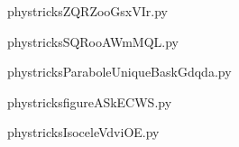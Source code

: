 
    \newcommand{\CaptionFigZQRZooGsxVIr}{<+Type your caption here+>}
    \begin{center}
        
    \end{center}
    phystricksZQRZooGsxVIr.py

    

    \clearpage
    


    \newcommand{\CaptionFigSQRooAWmMQL}{<+Type your caption here+>}
    \begin{center}
        
    \end{center}
    phystricksSQRooAWmMQL.py

    

    \clearpage
    


    \newcommand{\CaptionFigParaboleUniqueBaskGdqda}{<+Type your caption here+>}
    \begin{center}
        
    \end{center}
    phystricksParaboleUniqueBaskGdqda.py

    

    \clearpage
    


    \newcommand{\CaptionFigfigureASkECWS}{<+Type your caption here+>}
    \begin{center}
        
    \end{center}
    phystricksfigureASkECWS.py

    

    \clearpage
    


    \newcommand{\CaptionFigIsoceleVdviOE}{<+Type your caption here+>}
    \begin{center}
        
    \end{center}
    phystricksIsoceleVdviOE.py

    

    \clearpage
    


